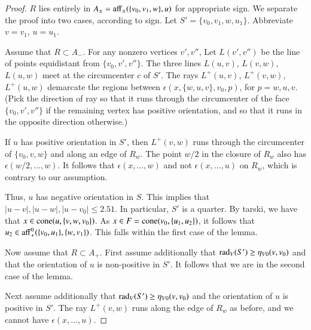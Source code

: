 \begin{proof} $R$ lies entirely in
$A_\pm={\operatorname{aff}}_\pm(\{v_0,v_1,w\},u)$ for appropriate sign.
We separate the proof into two cases, according to sign.
Let $S'=\{v_0,v_1,w,u_1\}$.  Abbreviate $v=v_1$, $u=u_1$.

Assume that $R\subset A_-$.
For any nonzero vertices $v',v''$,
Let $L(v',v'')$ be the line of points equidistant from $\{v_0,v',v''\}$.
The three lines $L(u,v)$, $L(v,w)$, $L(u,w)$ meet at the circumcenter
$c$ of $S'$.  The rays $L^+(u,v)$, $L^+(v,w)$, $L^+(u,w)$ demarcate
the regions between $\epsilon(x,\{w,u,v\},v_0,p)$, for $p=w,u,v$.  
(Pick the direction
of ray so that it runs through the circumcenter of the face $\{v_0,v',v''\}$
if the remaining vertex has positive orientation, and so that it
runs in the opposite direction otherwise.)

If $u$ has positive orientation in $S'$, then $L^+(v,w)$ runs through
the circumcenter of $\{v_0,v,w\}$ and along an edge of $R_w$.
The point $w/2$ in the closure of  $R_w$ also has 
$\epsilon(w/2,\ldots,w)$.
It follows that $\epsilon(x,\ldots,w)$ and not $\epsilon(x,\ldots,u)$
on $R_w$, which is contrary
to our assumption.

Thus, $u$ has negative orientation in $S$.  
This implies that $|u-v|,|u-w|,|u-v_0|\le 2.51$.  In particular,
$S'$ is a quarter.  By tarski, we have
that $x\in {\operatorname{cone}}(u,\{v,w,v_0\})$.  As $x\in F = {\operatorname{cone}}(v_0,\{u_1,u_2\})$, it follows that $u_2\in {\operatorname{aff}}_+^0(\{v_0,u_1\},\{w,v_1\})$.
This falls within the first case of the lemma.


Now assume that $R\subset A_+$.
First assume additionally that
$\operatorname{rad}_V(S')\ge \eta_{V0}(v,v_0)$ and that
the orientation of $u$ is non-positive in $S'$.  It
follows that we are in the second case of the lemma.  

Next assume additionally that
$\operatorname{rad}_V(S')\ge \eta_{V0}(v,v_0)$ and the orientation of $u$ is positive
in $S'$.  The ray $L^+(v,w)$ runs along the edge of 
$R_w$ as before, and we cannot have $\epsilon(x,\ldots,u)$.


\end{proof}

